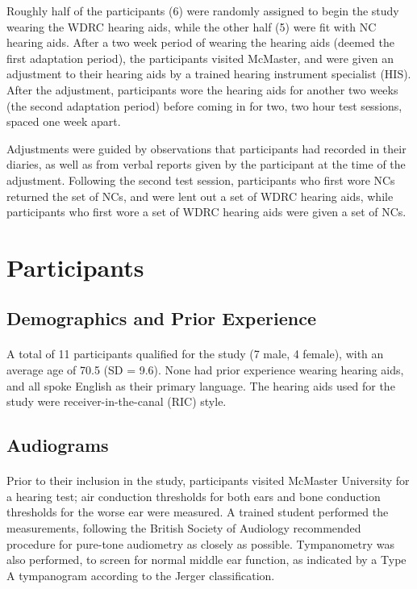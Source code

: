 Roughly half of the participants (6) were randomly assigned to begin the study wearing the WDRC hearing aids, while the other half (5) were fit with NC hearing aids.  After a two week period of wearing the hearing aids (deemed the first adaptation period), the participants visited McMaster, and were given an adjustment to their hearing aids by a trained hearing instrument specialist (HIS).  After the adjustment, participants wore the hearing aids for another two weeks (the second adaptation period) before coming in for two, two hour test sessions, spaced one week apart.

Adjustments were guided by observations that participants had recorded in their diaries, as well as from verbal reports given by the participant at the time of the adjustment.  Following the second test session, participants who first wore NCs returned the set of NCs, and were lent out a set of WDRC hearing aids, while participants who first wore a set of WDRC hearing aids were given a set of NCs.

\section{Participants}

\subsection{Demographics and Prior Experience}
\paragraph{}A total of 11 participants qualified for the study (7 male, 4 female), with an average age of 70.5 (SD = 9.6).  None had prior experience wearing hearing aids, and all spoke English as their primary language.  The hearing aids used for the study were receiver-in-the-canal (RIC) style.

\subsection{Audiograms}
\paragraph{}Prior to their inclusion in the study, participants visited McMaster University for a hearing test; air conduction thresholds for both ears and bone conduction thresholds for the worse ear were measured.  A trained student performed the measurements, following the British Society of Audiology recommended procedure for pure-tone audiometry \cite{BSA2004} as closely as possible.  Tympanometry was also performed, to screen for normal middle ear function, as indicated by a Type A tympanogram according to the Jerger classification.

